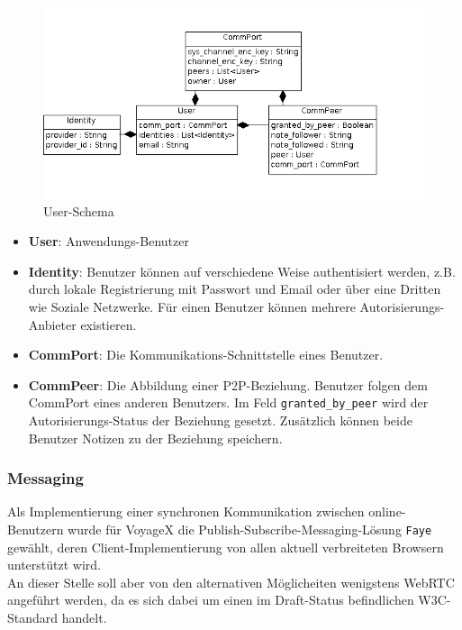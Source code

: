   \begin{figure}[H]
      \centering
	  \includegraphics[scale=0.6]{bilder/uml/er_user.png}
  	  \caption{User-Schema}
  \end{figure}

\begin{itemize}[leftmargin=*,noitemsep,topsep=1ex,parsep=0pt,partopsep=0pt]
\item \textbf{User}: Anwendungs-Benutzer
\item \textbf{Identity}: Benutzer können auf verschiedene Weise authentisiert werden, z.B. durch lokale Registrierung mit Passwort und Email oder über eine Dritten wie Soziale Netzwerke. Für einen Benutzer können mehrere Autorisierungs-Anbieter existieren.
\item \textbf{CommPort}: Die Kommunikations-Schnittstelle eines Benutzer.
\item \textbf{CommPeer}: Die Abbildung einer P2P-Beziehung. Benutzer folgen dem CommPort eines anderen Benutzers. Im Feld \texttt{granted\_by\_peer} wird der Autorisierungs-Status der Beziehung gesetzt. Zusätzlich können beide Benutzer Notizen zu der Beziehung speichern.
\end{itemize}


\subsubsection{Messaging}\label{5_MESSGNG}
Als Implementierung einer synchronen Kommunikation zwischen online-Benutzern wurde für VoyageX die Publish-Subscribe-Messaging-Lösung \texttt{Faye} gewählt, deren Client-Implementierung von allen aktuell verbreiteten Browsern unterstützt wird.\\
An dieser Stelle soll aber von den alternativen Möglicheiten wenigstens WebRTC angeführt werden, da es sich dabei um einen im Draft-Status befindlichen W3C-Standard handelt.

